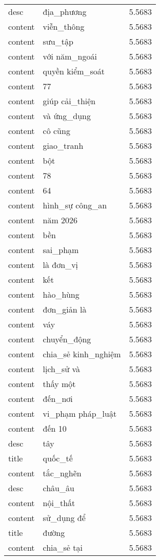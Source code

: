 \documentclass{article}
\begin{document}
\begin{tabular}{lll}
desc & địa\_phương & 5.5683\\
content & viễn\_thông & 5.5683\\
content & sưu\_tập & 5.5683\\
content & với năm\_ngoái & 5.5683\\
content & quyền kiểm\_soát & 5.5683\\
content & 77 & 5.5683\\
content & giúp cải\_thiện & 5.5683\\
content & và ứng\_dụng & 5.5683\\
content & cô cũng & 5.5683\\
content & giao\_tranh & 5.5683\\
content & bột & 5.5683\\
content & 78 & 5.5683\\
content & 64 & 5.5683\\
content & hình\_sự công\_an & 5.5683\\
content & năm 2026 & 5.5683\\
content & bền & 5.5683\\
content & sai\_phạm & 5.5683\\
content & là đơn\_vị & 5.5683\\
content & kết & 5.5683\\
content & hào\_hùng & 5.5683\\
content & đơn\_giản là & 5.5683\\
content & váy & 5.5683\\
content & chuyển\_động & 5.5683\\
content & chia\_sẻ kinh\_nghiệm & 5.5683\\
content & lịch\_sử và & 5.5683\\
content & thấy một & 5.5683\\
content & đến\_nơi & 5.5683\\
content & vi\_phạm pháp\_luật & 5.5683\\
content & đến 10 & 5.5683\\
desc & tây & 5.5683\\
title & quốc\_tế & 5.5683\\
content & tắc\_nghẽn & 5.5683\\
desc & châu\_âu & 5.5683\\
content & nội\_thất & 5.5683\\
content & sử\_dụng để & 5.5683\\
title & đường & 5.5683\\
content & chia\_sẻ tại & 5.5683\\

\end{tabular}
\end{document}
